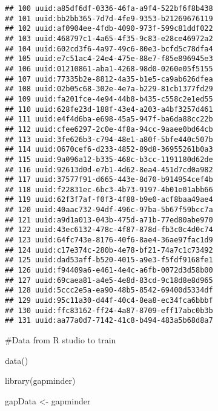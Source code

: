 \documentclass[
]{article}
\newenvironment{Shaded}{\begin{snugshade}}{\end{snugshade}}
\newcommand{\FunctionTok}[1]{\textcolor[rgb]{0.00,0.00,0.00}{#1}}
\newcommand{\NormalTok}[1]{#1}
\newcommand{\OtherTok}[1]{\textcolor[rgb]{0.56,0.35,0.01}{#1}}
\begin{document}
\begin{verbatim}
## 100 uuid:a85df6df-0336-46fa-a9f4-522bf6f8b438
## 101 uuid:bb2bb365-7d7d-4fe9-9353-b21269676119
## 102 uuid:af0904ee-4fdb-4090-973f-599c81ddf022
## 103 uuid:468797c1-4a65-4f35-9c83-e28ce46972a2
## 104 uuid:602cd3f6-4a97-49c6-80e3-bcfd5c78dfa4
## 105 uuid:e7c51ac4-24e4-475e-88e7-f85e896945e3
## 106 uuid:01210861-aba1-4268-98d0-0260e05f5155
## 107 uuid:77335b2e-8812-4a35-b1e5-ca9ab626dfea
## 108 uuid:02b05c68-302e-4e7a-b229-81cb1377fd29
## 109 uuid:fa201fce-4e94-44b8-b435-c558c2e1ed55
## 110 uuid:628fe23d-188f-43e4-a203-a4bf3257d461
## 111 uuid:e4f4d6ba-e698-45a5-947f-ba6da88cc22b
## 112 uuid:cfee6297-2c0e-4f8a-94cc-9aaee0bd64cb
## 113 uuid:3fe626b3-c794-48e1-a80f-5bfe440c507b
## 114 uuid:0670cef6-d233-4852-89d8-36955261b0a3
## 115 uuid:9a096a12-b335-468c-b3cc-1191180d62de
## 116 uuid:92613d0d-e7b1-4d62-8ea4-451d7cd0a982
## 117 uuid:37577f91-d665-443e-8d70-b914954cef4b
## 118 uuid:f22831ec-6bc3-4b73-9197-4b01e01abb66
## 119 uuid:62f3f7af-f0f3-4f88-b9e0-acf8baa49ae4
## 120 uuid:40aac732-94df-496c-97ba-5b67f59bcc7a
## 121 uuid:a9d1a013-043b-475d-a71b-77ed80abe970
## 122 uuid:43ec6132-478c-4f87-878d-fb3c0c4d0c74
## 123 uuid:64fc743e-8176-40f6-8ae4-36ae97fac1d9
## 124 uuid:c17e374c-280b-4e78-bf21-74a7c1c73492
## 125 uuid:dad53aff-b520-4015-a9e3-f5fdf9168fe1
## 126 uuid:f94409a6-e461-4e4c-a6fb-0072d3d58b00
## 127 uuid:69caea81-a4e5-4e8d-83cd-9c18d8e8d965
## 128 uuid:5ccc2e5a-ea90-48b5-8542-69400d5334df
## 129 uuid:95c11a30-d44f-40c4-8ea8-ec34fca6bbbf
## 130 uuid:ffc83162-ff24-4a87-8709-eff17abc0b3b
## 131 uuid:aa77a0d7-7142-41c8-b494-483a5b68d8a7
\end{verbatim}

\#Data from R studio to train

\begin{Shaded}
\begin{Highlighting}[]
\FunctionTok{data}\NormalTok{()}
\end{Highlighting}
\end{Shaded}

\begin{Shaded}
\begin{Highlighting}[]
\FunctionTok{library}\NormalTok{(gapminder)}
\end{Highlighting}
\end{Shaded}

\begin{Shaded}
\begin{Highlighting}[]
\NormalTok{gapData }\OtherTok{\textless{}{-}}\NormalTok{ gapminder}
\end{Highlighting}
\end{Shaded}
\end{document}
